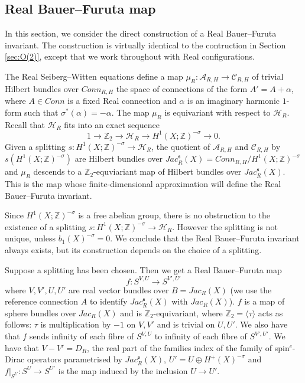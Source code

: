 \documentclass{amsart}
\theoremstyle{definition}
\theoremstyle{remark}
\numberwithin{equation}{section}
\begin{document}
\subsection{Real Bauer--Furuta map}\label{sec:realbf}

In this section, we consider the direct construction of a Real Bauer--Furuta invariant. The construction is virtually identical to the contruction in Section \ref{sec:O(2)}, except that we work throughout with Real configurations. 

The Real Seiberg--Witten equations define a map $\mu_R : \mathcal{A}_{R,H} \to \mathcal{C}_{R,H}$ of trivial Hilbert bundles over $Conn_{R,H}$ the space of connections of the form $A' = A + \alpha$, where $A \in Conn$ is a fixed Real connection and $\alpha$ is an imaginary harmonic $1$-form such that $\sigma^*(\alpha) = -\alpha$. The map $\mu_R$ is equivariant with respect to $\mathcal{H}_R$. Recall that $\mathcal{H}_R$ fits into an exact sequence
\[
1 \to \mathbb{Z}_2 \to \mathcal{H}_R \to H^1(X ; \mathbb{Z})^{-\sigma} \to 0.
\]
Given a splitting $s : H^1(X ; \mathbb{Z})^{-\sigma} \to \mathcal{H}_R$, the quotient of $\mathcal{A}_{R,H}$ and $\mathcal{C}_{R,H}$ by $s(H^1(X ; \mathbb{Z})^{-\sigma})$ are Hilbert bundles over $Jac_R^{\mathfrak{s}}(X) = Conn_{R,H}/H^1(X;\mathbb{Z})^{-\sigma}$ and $\mu_R$ descends to a $\mathbb{Z}_2$-equviariant map of Hilbert bundles over $Jac_R^{\mathfrak{s}}(X)$. This is the map whose finite-dimensional approximation will define the Real Bauer--Furuta invariant.

Since $H^1(X ; \mathbb{Z})^{-\sigma}$ is a free abelian group, there is no obstruction to the existence of a splitting $s : H^1(X ; \mathbb{Z})^{-\sigma} \to \mathcal{H}_R$. However the splitting is not unique, unless $b_1(X)^{-\sigma} = 0$. We conclude that the Real Bauer--Furuta invariant always exists, but its construction depends on the choice of a splitting.

Suppose a splitting has been chosen. Then we get a Real Bauer--Furuta map
\[
f : S^{V,U} \to S^{V',U'}
\]
where $V,V',U,U'$ are real vector bundles over $B = Jac_R(X)$ (we use the reference connection $A$ to identify $Jac_R^{\mathfrak{s}}(X)$ with $Jac_R(X)$). $f$ is a map of sphere bundles over $Jac_R(X)$ and is $\mathbb{Z}_2$-equivariant, where $\mathbb{Z}_2 = \langle \tau \rangle$ acts as follows: $\tau$ is multiplication by $-1$ on $V,V'$ and is trivial on $U,U'$. We also have that $f$ sends infinity of each fibre of $S^{V,U}$ to infinity of each fibre of $S^{V',U'}$. We have that $V - V' = D_R$, the real part of the families index of the family of spin$^c$-Dirac operators parametrised by $Jac^{\mathfrak{s}}_R(X)$, $U' = U \oplus H^+(X)^{-\sigma}$ and $f|_{S^U} : S^U \to S^{U'}$ is the map induced by the inclusion $U \to U'$.
\end{document}
